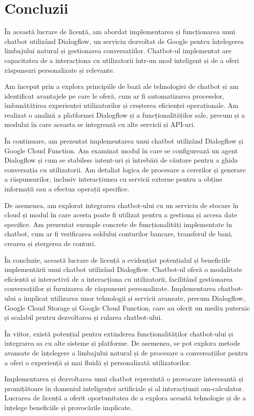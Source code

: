 \chapter{Concluzii}

În această lucrare de licență, am abordat implementarea și funcționarea unui chatbot utilizând Dialogflow, un serviciu dezvoltat de Google pentru înțelegerea limbajului natural și gestionarea conversațiilor. Chatbot-ul implementat are capacitatea de a interacționa cu utilizatorii într-un mod inteligent și de a oferi răspunsuri personalizate și relevante.

Am început prin a explora principiile de bază ale tehnologiei de chatbot și am identificat avantajele pe care le oferă, cum ar fi automatizarea proceselor, îmbunătățirea experienței utilizatorilor și creșterea eficienței operaționale. Am realizat o analiză a platformei Dialogflow și a funcționalităților sale, precum și a modului în care aceasta se integrează cu alte servicii și API-uri.

În continuare, am prezentat implementarea unui chatbot utilizând Dialogflow și Google Cloud Function. Am examinat modul în care se configurează un agent Dialogflow și cum se stabilesc intent-uri și întrebări de căutare pentru a ghida conversația cu utilizatorii. Am detaliat logica de procesare a cererilor și generare a răspunsurilor, inclusiv interacțiunea cu servicii externe pentru a obține informații sau a efectua operații specifice.

De asemenea, am explorat integrarea chatbot-ului cu un serviciu de stocare în cloud și modul în care acesta poate fi utilizat pentru a gestiona și accesa date specifice. Am prezentat exemple concrete de funcționalități implementate în chatbot, cum ar fi verificarea soldului conturilor bancare, transferul de bani, crearea și ștergerea de conturi.

În concluzie, această lucrare de licență a evidențiat potențialul și beneficiile implementării unui chatbot utilizând Dialogflow. Chatbot-ul oferă o modalitate eficientă și interactivă de a interacționa cu utilizatorii, facilitând gestionarea conversațiilor și furnizarea de răspunsuri personalizate. Implementarea chatbot-ului a implicat utilizarea unor tehnologii și servicii avansate, precum Dialogflow, Google Cloud Storage și Google Cloud Function, care au oferit un mediu puternic și scalabil pentru dezvoltarea și rularea chatbot-ului.

În viitor, există potențial pentru extinderea funcționalităților chatbot-ului și integrarea sa cu alte sisteme și platforme. De asemenea, se pot explora metode avansate de înțelegere a limbajului natural și de procesare a conversațiilor pentru a oferi o experiență și mai fluidă și personalizată utilizatorilor.

Implementarea și dezvoltarea unui chatbot reprezintă o provocare interesantă și promițătoare în domeniul inteligenței artificiale și al interacțiunii om-calculator. Lucrarea de licență a oferit oportunitatea de a explora această tehnologie și de a înțelege beneficiile și provocările implicate.